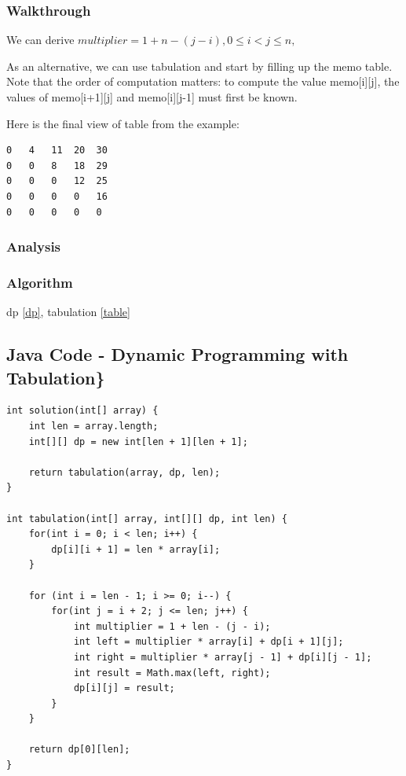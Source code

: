 \documentclass[]{book}
\begin{document}
\hypertarget{walkthrough-39}{%
\subsubsection{Walkthrough}\label{walkthrough-39}}

We can derive \(multiplier = 1 + n - (j - i), 0 \le i < j \le n,\)

As an alternative, we can use tabulation and start by filling up the memo table. Note that the order of computation
matters: to compute the value memo{[}i{]}{[}j{]}, the values of memo{[}i+1{]}{[}j{]} and memo{[}i{]}{[}j-1{]} must first be known.

Here is the final view of table from the example:

\begin{verbatim}
0   4   11  20  30
0   0   8   18  29
0   0   0   12  25
0   0   0   0   16
0   0   0   0   0
\end{verbatim}

\hypertarget{analysis-42}{%
\subsubsection{Analysis}\label{analysis-42}}

\hypertarget{algorithm-42}{%
\subsubsection{Algorithm}\label{algorithm-42}}

dp \ref{dp}, tabulation \ref{table}

\hypertarget{java-code---dynamic-programming-with-tabulation}{%
\subsection{Java Code - Dynamic Programming with Tabulation\}}\label{java-code---dynamic-programming-with-tabulation}}

\begin{verbatim}
int solution(int[] array) {
    int len = array.length;
    int[][] dp = new int[len + 1][len + 1];

    return tabulation(array, dp, len);
}

int tabulation(int[] array, int[][] dp, int len) {
    for(int i = 0; i < len; i++) {
        dp[i][i + 1] = len * array[i];
    }

    for (int i = len - 1; i >= 0; i--) {
        for(int j = i + 2; j <= len; j++) {
            int multiplier = 1 + len - (j - i);
            int left = multiplier * array[i] + dp[i + 1][j];
            int right = multiplier * array[j - 1] + dp[i][j - 1];
            int result = Math.max(left, right);
            dp[i][j] = result;
        }
    }

    return dp[0][len];
}
\end{verbatim}
\end{document}
